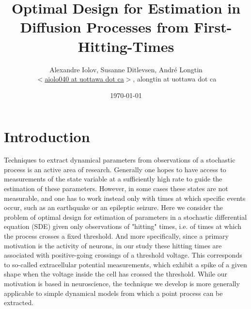 \documentclass{article}
\begin{document}
\title{Optimal Design for Estimation in Diffusion Processes from
First-Hitting-Times}
\author{Alexandre Iolov, Susanne Ditlevsen, Andr\'e Longtin  \\
$<$\href{mailto:aiolo040@uottawa.ca}
		{aiolo040 at uottawa dot ca}$>$, alongtin at uottawa dot ca}

\date{\today}

\maketitle  

 


\tableofcontents

\listoftables  

\listoffigures

\section{Introduction}
Techniques to extract dynamical parameters from observations of a stochastic
process is an active area of research. Generally one hopes to have access to
measurements of the state variable at a sufficiently high rate to guide the
estimation of these parameters. However, in some cases these states are not
measurable, and one has to work instead only with times at which specific events
occur, such as an earthquake or an epileptic seizure. Here we consider the
problem of optimal design for estimation of parameters in a stochastic
differential equation (SDE) given only observations of "hitting" times, i.e. of
times at which the process crosses a fixed threshold. And more specifically,
since a primary motivation is the activity of neurons, in our study these
hitting times are associated with positive-going crossings of a threshold
voltage. This corresponds to so-called extracellular potential measurements,
which exhibit a spike of a given shape when the voltage inside the cell has
crossed the threshold. While our motivation is based in neuroscience, the
technique we develop is more generally applicable to simple dynamical models
from which a point process can be extracted.
\end{document}
